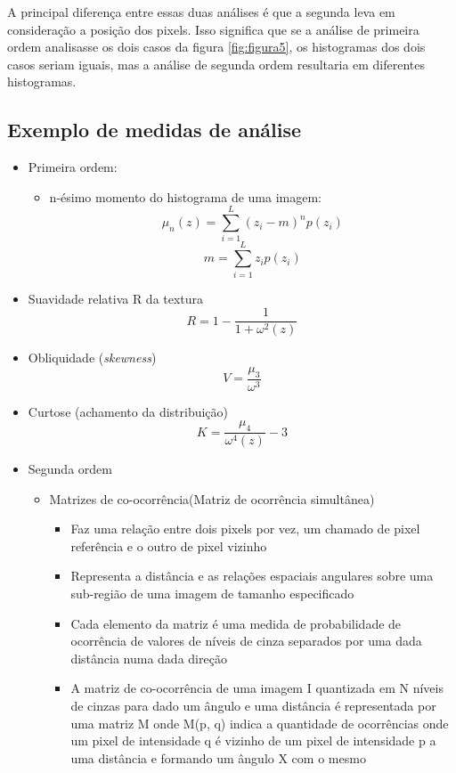 \documentclass{article}
\begin{document}
A principal diferença entre essas duas análises é que a segunda leva em consideração a posição dos pixels. Isso significa que se a análise de primeira ordem analisasse os dois casos da figura \ref{fig:figura5}, os histogramas dos dois casos seriam iguais, mas a análise de segunda ordem resultaria em diferentes histogramas.

\subsection{Exemplo de medidas de análise}
\begin{itemize}
    \item Primeira ordem:
    \begin{itemize}
        \item n-ésimo momento do histograma de uma imagem:
        $$ \mu _{n}(z)=\sum_{i=1}^{L} (z_{i}-m)^n p(z_{i})$$
        $$m=\sum_{i=1}^{L}z_{i}p(z_{i})$$
    \end{itemize}
    
    \item Suavidade relativa R da textura
    $$R=1-\frac{1}{1+\omega^2(z)}$$
    
    \item Obliquidade (\textit{skewness})
    $$V=\frac{\mu_{3}}{\omega^3}$$
    
    \item Curtose (achamento da distribuição)
    $$K=\frac{\mu_{4}}{\omega^4(z)}-3$$
    
    \item Segunda ordem
    \begin{itemize}
        \item Matrizes de co-ocorrência(Matriz de ocorrência simultânea)
    
        \begin{itemize}
            \item Faz uma relação entre dois pixels por vez, um chamado de pixel referência e o outro de pixel vizinho
            \item Representa a distância e as relações espaciais angulares sobre uma sub-região de uma imagem de tamanho especificado
            \item Cada elemento da matriz é uma medida de probabilidade de ocorrência de valores de níveis de cinza separados por uma dada distância numa dada direção 
            \item A matriz de co-ocorrência de uma imagem I quantizada em N níveis de cinzas para dado um ângulo e uma distância é representada por uma matriz M onde M(p, q) indica a quantidade de ocorrências onde um pixel de intensidade q é vizinho de um pixel de intensidade p a uma distância e formando um ângulo X com o mesmo
        \end{itemize}
        

\end{itemize}
\end{itemize}
\end{document}
